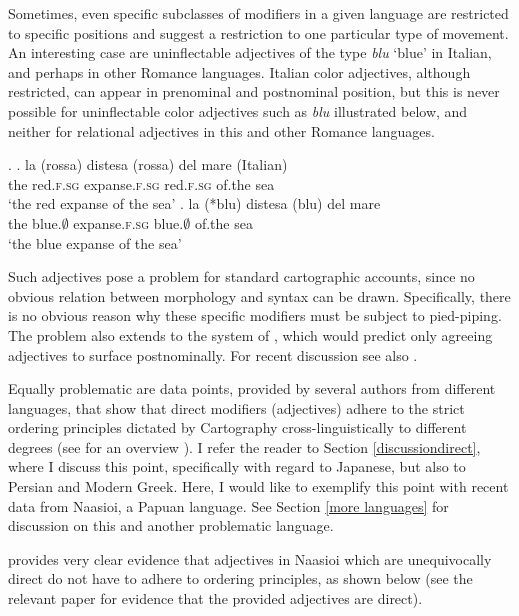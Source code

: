 Sometimes, even specific subclasses of modifiers in a given language are restricted to specific positions and suggest a restriction to one particular type of movement. An interesting case are uninflectable adjectives of the type \textit{blu} `blue’ in  Italian, and perhaps in other Romance languages. Italian color adjectives, although restricted, can appear in prenominal and postnominal position, but this is never possible for uninflectable color adjectives such as \textit{blu} illustrated below, and neither for relational adjectives in this and other Romance languages. 

\newpage

\ex. \ag. la (rossa) distesa (rossa) del mare (Italian)\\
the red.\textsc{f.sg} expanse.\textsc{f.sg} red.\textsc{f.sg} of.the sea\\
`the red expanse of the sea'
\bg. la (*blu) distesa (blu) del mare\\
the blue.\textsc{$\emptyset$} expanse.\textsc{f.sg} blue.\textsc{$\emptyset$} of.the sea\\
`the blue expanse of the sea' \null \hfill \citep[110]{mattiuzzi:2023:influential}

Such adjectives pose a problem for standard cartographic accounts, since no obvious relation between morphology and syntax can be drawn. Specifically, there is no obvious reason why these specific modifiers must be subject to pied-piping. The problem also extends to the system of \citet{laenzlinger:2005:french, laenzlinger:2011:elements}, which would predict only agreeing adjectives to surface postnominally. For recent discussion see also \citet{mattiuzzi:2023:influential}.

Equally problematic are data points, provided by several authors from different languages, that show that direct modifiers (adjectives) adhere to the strict ordering principles dictated by Cartography cross-linguistically to different degrees (see for an overview \citealt{manzini:2025:left}). I refer the reader to Section \ref{discussiondirect}, where I discuss this point, specifically with regard to Japanese, but also to Persian and Modern Greek. Here, I would like to exemplify this point with recent data from  Naasioi, a Papuan language. See Section \ref{more languages} for discussion on this and another problematic language.

\citet{brown:2024:adj} provides very clear evidence that adjectives in Naasioi which are unequivocally direct do not have to adhere to ordering principles, as shown below (see the relevant paper for evidence that the provided adjectives are direct).

